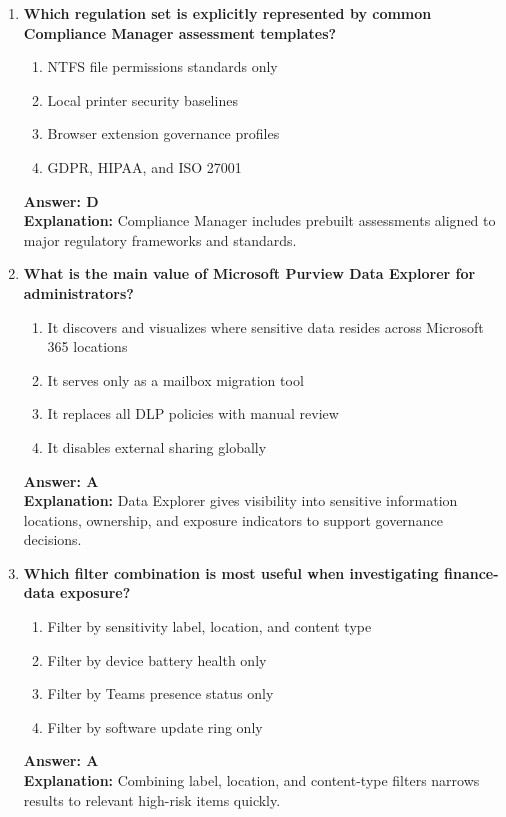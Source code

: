 \documentclass[10pt]{article}
\begin{document}
\begin{enumerate}[leftmargin=*]
\item \textbf{Which regulation set is explicitly represented by common Compliance Manager assessment templates?}
\begin{enumerate}[label=\Alph*.]
  \item NTFS file permissions standards only
  \item Local printer security baselines
  \item Browser extension governance profiles
  \item GDPR, HIPAA, and ISO 27001
\end{enumerate}
\textbf{Answer: D}\\
\textbf{Explanation:} Compliance Manager includes prebuilt assessments aligned to major regulatory frameworks and standards.

\item \textbf{What is the main value of Microsoft Purview Data Explorer for administrators?}
\begin{enumerate}[label=\Alph*.]
  \item It discovers and visualizes where sensitive data resides across Microsoft 365 locations
  \item It serves only as a mailbox migration tool
  \item It replaces all DLP policies with manual review
  \item It disables external sharing globally
\end{enumerate}
\textbf{Answer: A}\\
\textbf{Explanation:} Data Explorer gives visibility into sensitive information locations, ownership, and exposure indicators to support governance decisions.

\item \textbf{Which filter combination is most useful when investigating finance-data exposure?}
\begin{enumerate}[label=\Alph*.]
  \item Filter by sensitivity label, location, and content type
  \item Filter by device battery health only
  \item Filter by Teams presence status only
  \item Filter by software update ring only
\end{enumerate}
\textbf{Answer: A}\\
\textbf{Explanation:} Combining label, location, and content-type filters narrows results to relevant high-risk items quickly.


\end{enumerate}
\end{document}
